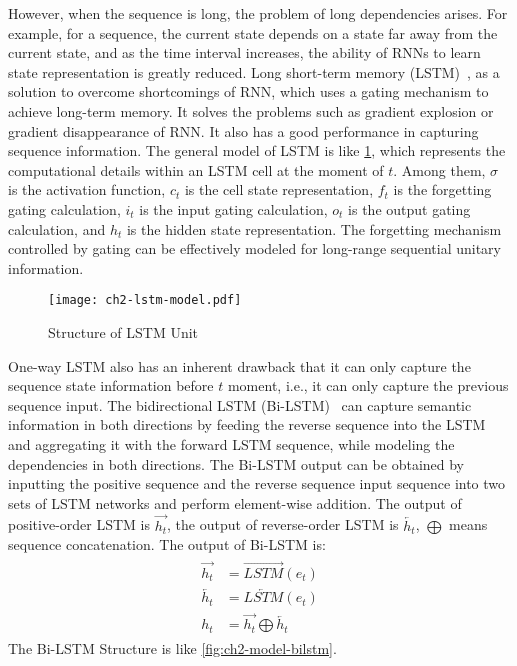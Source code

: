 However, when the sequence is long, the problem of long dependencies arises. For example, for a sequence, the current state depends on a state far away from the current state, and as the time interval increases, the ability of RNNs to learn state representation is greatly reduced. Long short-term memory (LSTM)~\cite{lstm1997}, as a solution to overcome shortcomings of RNN, which uses a gating mechanism to achieve long-term memory. It solves the problems such as gradient explosion or gradient disappearance of RNN. It also has a good performance in capturing sequence information. The general model of LSTM is like \figurename{\ref{fig:ch2-lstm-model}}, which represents the computational details within an LSTM cell at the moment of \(t\). Among them, \(\sigma\) is the activation function, \(c_t\) is the cell state representation, \(f_t\) is the forgetting gating calculation, \(i_t\) is the input gating calculation, \(o_t\) is the output gating calculation, and \(h_t\) is the hidden state representation. The forgetting mechanism controlled by gating can be effectively modeled for long-range sequential unitary information.

\begin{figure}[htbp!]
	\centering
	\texttt{[image: ch2-lstm-model.pdf]}
	\caption{Structure of LSTM Unit}\label{fig:ch2-lstm-model}
\end{figure}

One-way LSTM also has an inherent drawback that it can only capture the sequence state information before \(t\) moment, i.e., it can only capture the previous sequence input. The bidirectional LSTM (Bi-LSTM)~\cite{graves2005framewise} can capture semantic information in both directions by feeding the reverse sequence into the LSTM and aggregating it with the forward LSTM sequence, while modeling the dependencies in both directions. The Bi-LSTM output can be obtained by inputting the positive sequence and the reverse sequence input sequence into two sets of LSTM networks and perform element-wise addition. The output of positive-order LSTM is \(\overrightarrow{h_t}\), the output of reverse-order LSTM is \(\overleftarrow{h_t}\), \(\bigoplus \) means sequence concatenation. The output of Bi-LSTM is:
\begin{align}
	\begin{split}
		\overrightarrow{h_t} & = \overrightarrow{LSTM}(e_t)                       \\
		\overleftarrow{h_t}  & = \overleftarrow{LSTM}(e_t)                        \\
		h_t                  & =\overrightarrow{h_t}\bigoplus \overleftarrow{h_t}
	\end{split}
\end{align}
The Bi-LSTM Structure is like \figurename{\ref{fig:ch2-model-bilstm}}.

